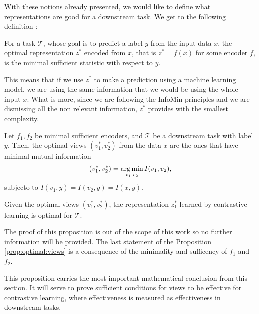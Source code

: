 With these notions already presented, we would like to define what representations are good for a downstream task. We get to the following definition \citep{tian_what_2020}:
\begin{ndef}
For a task $\mathcal T$, whose goal is to predict a label $y$ from the input data $x$, the optimal representation $z^*$ encoded from $x$, that is $z^* = f(x)$ for some encoder $f$, is the minimal sufficient statistic with respect to $y$.
\end{ndef}
This means that if we use $z^*$ to make a prediction using a machine learning model, we are using the same information that we would be using the whole input $x$. What is more, since we are following the InfoMin principles and we are dismissing all the non relevant information, $z^*$ provides with the smallest complexity.

\begin{nprop}\label{prop:optimal:views}
Let $f_1,f_2$ be minimal sufficient encoders, and $\mathcal T$ be a downstream task with label $y$. Then, the optimal views $(v_1^*,v_2^*)$ from the data $x$ are the ones that have minimal mutual information
\[
    (v_1^*,v_2^*) = \operatorname*{arg\,min}_{v_1,v_2} I(v_1,v_2),
\]
subjecto to $I(v_1,y) = I(v_2,y) = I(x,y)$.

Given the optimal views $(v_1^*,v_2^*)$, the representation $z_1^*$ learned by contrastive learning is optimal for $\mathcal T$.
\end{nprop}
The proof of this proposition is out of the scope of this work so no further information will be provided. The last statement of the Proposition \ref{prop:optimal:views} is a consequence of the minimality and sufficency of $f_1$ and $f_2$. 

This proposition carries the most important mathematical conclusion from this section. It will serve to prove sufficient conditions for views to be effective for contrastive learning, where effectiveness is measured as effectiveness in downstream tasks.



